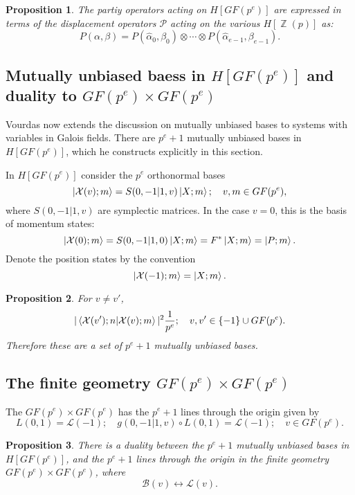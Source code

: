 \documentclass[a4paper]{article}
\DeclareMathOperator{\Z}{\mathbb{Z}}
\newtheorem{proposition}{Proposition}
\begin{document}
  \begin{proposition}
    The partiy operators acting on $H[GF(p^{e})]$ are
    expressed in terms of the displacement operators
    $\mathcal{P}$ acting on the various $H[\Z(p)]$ as:
    \[
      P(\alpha,\beta)
      = P(\hat \alpha_0,\beta_0) \otimes \cdots \otimes
      P(\hat \alpha_{e-1}, \beta_{e-1}).
    \] 
  \end{proposition}

  \subsection{Mutually unbiased baess in $H[GF(p^{e})]$ and
  duality to $GF(p^{e}) \times GF(p^{e})$}

  Vourdas now extends the discussion on mutually unbiased
  bases to systems with variables in Galois fields. There
  are $p^{e} + 1$ mutually unbiased bases in $H[GF(p^{e})]$,
  which he constructs explicitly in this section.

  In $H[GF(p^{e})]$ consider the $p^{e}$ orthonormal bases
  \[
    \ket{\mathcal{X}(v); m}
    = S(0,-1|1,v) \ket{X; m};
    \quad
    v,m \in GF(p^{e}),
  \] 
  where $S(0,-1|1,v)$ are symplectic matrices. In the case
  $v = 0$, this is the basis of momentum states:
  \[
    \ket{\mathcal{X}(0); m}
    = S(0,-1|1,0) \ket{X; m}
    = F^{*}\ket{X; m}
    = \ket{P; m}.
  \] 
  Denote the position states by the convention
  \[
    \ket{\mathcal{X}(-1); m}
    = \ket{X; m}.
  \] 
  \begin{proposition}
    For $v \neq v'$,
    \[
      |\braket{\mathcal{X}(v'); n|\mathcal{X}(v); m}|^2
      \frac{1}{p^{e}};
      \quad
      v, v' \in \{-1\} \cup GF(p^{e}).
    \] 
    Therefore these are a set of $p^{e}+1$ mutually unbiased
    bases.
  \end{proposition}

  \subsection{The finite geometry $GF(p^{e}) \times
  GF(p^{e})$}

  The $GF(p^{e}) \times GF(p^{e})$ has the $p^{e}+1$ lines
  through the origin given by
  \[
    L(0,1) = \mathcal{L}(-1);
    \quad
    g(0,-1|1,v) \circ L(0,1) = \mathcal{L}(-1);
    \quad
    v \in GF(p^{e}).
  \] 

  \begin{proposition}
    There is a duality between the $p^{e}+1$ mutually
    unbiased bases in $H[GF(p^{e})]$, and the $p^{e}+1$ 
    lines through the origin in the finite geometry
    $GF(p^{e}) \times GF(p^{e})$, where
    \[
      \mathcal{B}(v) \leftrightarrow \mathcal{L}(v).
    \] 
  \end{proposition}
\end{document}
